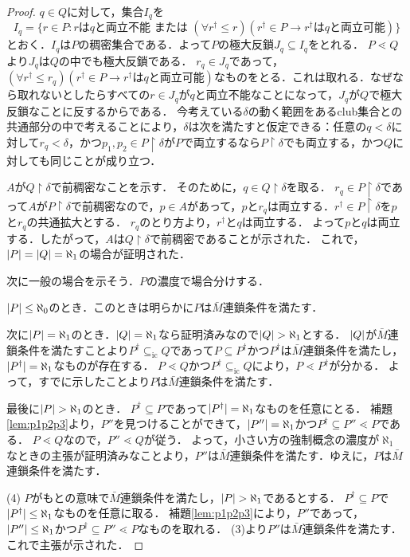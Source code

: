 \documentclass[uplatex]{jsarticle}
\newcommand{\restrict}{\upharpoonright}
\newcommand{\subsetic}{\subseteq_{\mathrm{ic}}}
\DeclarePairedDelimiter\abs{\lvert}{\rvert}
\renewcommand\subset{\subseteq}
\theoremstyle{definition}
\begin{document}
\begin{proof}
		$q \in Q$に対して，集合$I_q$を
		\[
		I_q = \{ r \in P : \text{$r$は$q$と両立不能 または } (\forall r^\dagger \le r)(r^\dagger \in P \rightarrow \text{$r^\dagger$は$q$と両立可能} )\}
		\]
		とおく．$I_q$は$P$の稠密集合である．よって$P$の極大反鎖$J_q \subset I_q$をとれる．
		$P \lessdot Q$より$J_q$は$Q$の中でも極大反鎖である．
		$r_q \in J_q$であって，$(\forall r^\dagger \le r_q)(r^\dagger \in P \rightarrow \text{$r^\dagger$は$q$と両立可能})$なものをとる．これは取れる．なぜなら取れないとしたらすべての$r \in J_q$が$q$と両立不能なことになって，$J_q$が$Q$で極大反鎖なことに反するからである．
		今考えている$\delta$の動く範囲をあるclub集合との共通部分の中で考えることにより，$\delta$は次を満たすと仮定できる：任意の$q < \delta$に対して$r_q < \delta$，かつ$p_1, p_2 \in P \restrict \delta$が$P$で両立するなら$P \restrict \delta$でも両立する，かつ$Q$に対しても同じことが成り立つ．
		
		$A$が$Q \restrict \delta$で前稠密なことを示す．
		そのために，$q \in Q \restrict \delta$を取る．
		$r_q \in P \restrict \delta$であって$A$が$P \restrict \delta$で前稠密なので，$p \in A$があって，$p$と$r_q$は両立する．$r^\dagger \in P \restrict \delta$を$p$と$r_q$の共通拡大とする．
		$r_q$のとり方より，$r^\dagger$と$q$は両立する．
		よって$p$と$q$は両立する．したがって，$A$は$Q \restrict \delta$で前稠密であることが示された．
		これで，$\abs{P} = \abs{Q} = \aleph_1$の場合が証明された．
		
		次に一般の場合を示そう．$P$の濃度で場合分けする．
		
		$\abs{P} \le \aleph_0$のとき．このときは明らかに$P$は$\bar{M}$連鎖条件を満たす．
		
		次に$\abs{P} = \aleph_1$のとき．$\abs{Q} = \aleph_1$なら証明済みなので$\abs{Q} > \aleph_1$とする．
		$\abs{Q}$が$\bar{M}$連鎖条件を満たすことより$P^\dagger \subsetic Q$であって$P \subset P^\dagger$かつ$P^\dagger$は$\bar{M}$連鎖条件を満たし，$\abs{P^\dagger} = \aleph_1$なものが存在する．
		$P \lessdot Q$かつ$P^\dagger \subsetic Q$により，$P \lessdot P^\dagger$が分かる．
		よって，すでに示したことより$P$は$\bar{M}$連鎖条件を満たす．
		
		最後に$\abs{P} > \aleph_1$のとき．
		$P^\dagger \subset P$であって$\abs{P^\dagger} = \aleph_1$なものを任意にとる．
		補題 \ref{lem:p1p2p3}より，$P''$を見つけることができて，$\abs{P''} = \aleph_1$かつ$P^\dagger \subset P'' \lessdot P$である．
		$P \lessdot Q$なので，$P'' \lessdot Q$が従う．
		よって，小さい方の強制概念の濃度が$\aleph_1$なときの主張が証明済みなことより，$P''$は$\bar{M}$連鎖条件を満たす．ゆえに，$P$は$\bar{M}$連鎖条件を満たす．
		
		(4) $P$がもとの意味で$\bar{M}$連鎖条件を満たし，$\abs{P} > \aleph_1$であるとする．
		$P^\dagger \subset P$で$\abs{P^\dagger} \le \aleph_1$なものを任意に取る．
		補題\ref{lem:p1p2p3}により，$P''$であって，$\abs{P''} 	\le \aleph_1$かつ$P^\dagger \subset P'' \lessdot P$なものを取れる．
		(3)より$P''$は$\bar{M}$連鎖条件を満たす．これで主張が示された．
	\end{proof}
\end{document}
